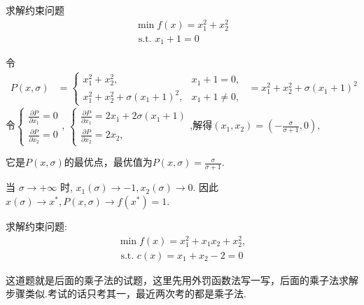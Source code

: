 \documentclass[cn]{elegantbook}
\begin{document}
\newpage
\begin{exercisez}
求解约束问题$$
\begin{array}{l}
\min f(x)=x_{1}^{2}+x_{2}^{2} \\
\text { s.t. } x_{1}+1 = 0
\end{array}$$
\end{exercisez}
\begin{solution}
令$$\begin{aligned}
P(x, \sigma)
&=\left\{\begin{array}{ll}
x_{1}^{2}+x_{2}^{2}, & x_{1}+1 = 0 ,\\
x_{1}^{2}+x_{2}^{2}+\sigma\left(x_{1}+1\right)^{2}, & x_{1}+1\neq 0,
\end{array}\right.
\end{aligned}=x_{1}^{2}+x_{2}^{2}+\sigma\left(x_{1}+1\right)^{2}$$
令$\begin{cases}
   \frac{\partial P}{\partial x_1}=0 \\
   \frac{\partial P}{\partial x_2}=0
 \end{cases}$,
$\begin{cases}
\frac{\partial P}{\partial x_1}=2x_1+2\sigma (x_1+1) \\
\frac{\partial P}{\partial x_2}=2x_2,
\end{cases}$,解得$(x_1,x_2)=(-\frac{\sigma}{\sigma+1},0),$

它是$P(x, \sigma)$的最优点，最优值为$P(x, \sigma)=\frac{\sigma}{\sigma+1}$.

当  $\sigma \rightarrow+\infty$  时,  $x_{1}(\sigma) \rightarrow-1, x_{2}(\sigma) \rightarrow 0 .$
因此 $ x(\sigma) \rightarrow x^{*}, P(x, \sigma) \rightarrow f\left(x^{*}\right)=1 .$

\end{solution}
\begin{exercisez}
 求解约束问题:
$$
\begin{array}{l}
\min f(x)=x_{1}^{2}+x_{1} x_{2}+x_{2}^{2}, \\
\text { s.t. } c(x)=x_{1}+x_{2}-2=0
\end{array}
$$
\end{exercisez}
\begin{solution}
\quad 这道题就是后面的乘子法的试题，这里先用外罚函数法写一写，后面的乘子法求解步骤类似.考试的话只考其一，最近两次考的都是乘子法.
\end{solution}
\vspace{18pt}
\end{document}
